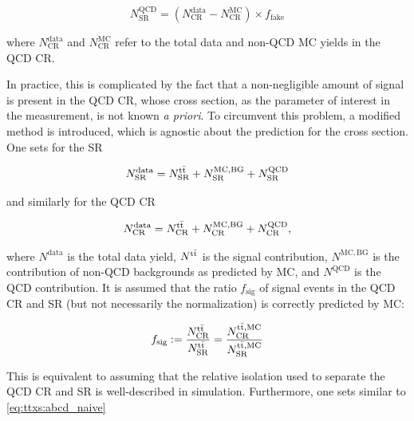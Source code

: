 \begin{equation}
\label{eq:ttxs:abcd_naive}
    N_{\text{SR}}^{\text{QCD}} = ( N_{\text{CR}}^{\text{data}} - N_{\text{CR}}^{\text{MC}} ) \times f_{\mathrm{fake}}
\end{equation}

\noindent where $N_{\text{CR}}^{\text{data}}$ and $N_{\text{CR}}^{\text{MC}}$ refer to the total data and non-QCD MC yields in the QCD CR.

In practice, this is complicated by the fact that a non-negligible amount of \ttbar signal is present in the QCD CR, whose cross section, as the parameter of interest in the measurement, is not known \textit{a priori}. %
To circumvent this problem, a modified method is introduced, which is agnostic about the prediction for the \ttbar cross section. 
One sets for the SR

\begin{equation}
\label{eq:ttxs:abcd_modified1}
    N^{\mathrm{data}}_{\mathrm{SR}} = N^{\mathrm{t \bar{t}}}_{\mathrm{SR}}+ N^{\mathrm{MC,BG}}_{\mathrm{SR}} + N^{\mathrm{QCD}}_{\mathrm{SR}}
\end{equation}

\noindent and similarly for the QCD CR

\begin{equation}
\label{eq:ttxs:abcd_modified2}
    N^{\mathrm{data}}_{\mathrm{CR}} = N^{\mathrm{t \bar{t}}}_{\mathrm{CR}} + N^{\mathrm{MC,BG}}_{\mathrm{CR}} + N^{\mathrm{QCD}}_{\mathrm{CR}},
\end{equation}

\noindent where $N^{\mathrm{data}}$ is the total data yield, $N^{\mathrm{t \bar{t}}}$ is the \ttbar signal contribution, $N^{\mathrm{MC,BG}}$ is the contribution of non-QCD backgrounds as predicted by MC, and $N^{\mathrm{QCD}}$ is the QCD contribution. It is assumed that the ratio $f_{\mathrm{sig}}$ of signal events in the QCD CR and SR (but not necessarily the normalization) is correctly predicted by MC:

\begin{equation}
\label{eq:ttxs:abcd_modified3}
    f_{\mathrm{sig}} := \frac{ N^{\mathrm{t \bar{t}}}_{\mathrm{CR}} }{ N^{\mathrm{t \bar{t}}}_{\mathrm{SR}} } = \frac{ N^{\mathrm{\mathrm{t \bar{t}},MC}}_{\mathrm{CR}} }{ N^{\mathrm{\mathrm{t \bar{t}},MC}}_{\mathrm{SR}} }
\end{equation}

This is equivalent to assuming that the relative isolation \Irel used to separate the QCD CR and SR is well-described in \ttbar simulation. Furthermore, one sets similar to \cref{eq:ttxs:abcd_naive}

